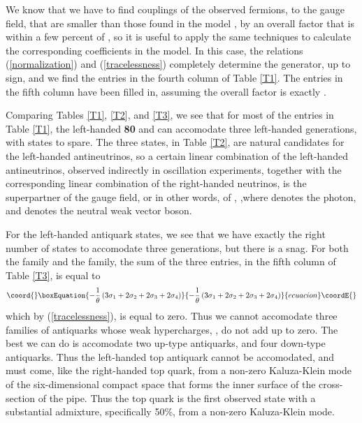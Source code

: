 \documentclass[a4paper,12pt,oneside]{article}
\begin{document}
We know that we have to find couplings of the observed fermions, to
the \coordHE{} gauge field, that are smaller than those found
in the \coordHE{} model \cite{GG, Mohapatra}, by an overall
factor that is within a few percent of \coordHE{}, so it 
is useful to apply the same techniques to calculate the 
corresponding coefficients in the \coordHE{} model.  In this
case, the relations (\ref{normalization}) and (\ref{tracelessness})
completely determine the \coordHE{} generator, up to sign, and
we find the entries in the fourth column of Table \ref{T1}.  The
entries in the fifth column have been filled in, assuming the 
overall factor is exactly \coordHE{}.

Comparing Tables \ref{T1}, \ref{T2}, and \ref{T3}, we see that for 
most of the entries in Table \ref{T1}, the left-handed \textbf{80} 
and \coordHE{} can accomodate three left-handed
generations, with states to spare.  The three \coordHE{}
states, in Table \ref{T2}, are natural candidates for the 
left-handed antineutrinos, so a certain linear combination of the
left-handed antineutrinos, observed indirectly in oscillation
experiments, together with the corresponding linear combination of
the right-handed neutrinos, is the superpartner of the \coordHE{} 
gauge field, or in other words, of \coordHE{}, \cite{Rosner},where \coordHE{} denotes the photon, and \coordHE{}
denotes the neutral weak vector boson.

For the \coordHE{} left-handed antiquark states, we see that we
have exactly the right number of states to accomodate three 
generations, but there is a snag.  For both the \coordHE{} family
and the \coordHE{} family, the sum of the three entries, in the
fifth column of Table \ref{T3}, is equal to
\begin{equation}\coord{}\boxEquation{\label{sum of three entries}
-\frac{1}{\theta}
\left(3\sigma_1+2\sigma_2+2\sigma_3+2\sigma_4\right)
}{-\frac{1}{\theta}
\left(3\sigma_1+2\sigma_2+2\sigma_3+2\sigma_4\right)
}{ecuacion}\coordE{}\end{equation}
which by (\ref{tracelessness}), is equal to zero.  Thus we cannot
accomodate three families of antiquarks whose weak hypercharges, 
\coordHE{}, do not add up to zero.  The best we can do is accomodate two
up-type antiquarks, and four down-type antiquarks.  Thus the 
left-handed top antiquark cannot be accomodated, and must come, 
like the right-handed top quark, from
a non-zero Kaluza-Klein mode of the six-dimensional compact space 
that forms the inner surface of the cross-section of the pipe.  Thus
the top quark is the first observed state with a substantial
admixture, specifically 50\%, from a non-zero Kaluza-Klein mode.
\end{document}
